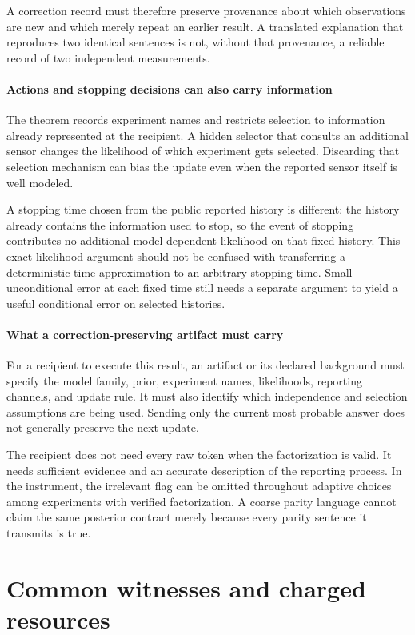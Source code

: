 \documentclass[11pt,letterpaper]{article}
\theoremstyle{plain}
\theoremstyle{definition}
\begin{document}
A correction record must therefore preserve provenance about which observations are new and which merely repeat an earlier result. A translated explanation that reproduces two identical sentences is not, without that provenance, a reliable record of two independent measurements.

\subsection{Actions and stopping decisions can also carry information}
The theorem records experiment names and restricts selection to information already represented at the recipient. A hidden selector that consults an additional sensor changes the likelihood of which experiment gets selected. Discarding that selection mechanism can bias the update even when the reported sensor itself is well modeled.

A stopping time chosen from the public reported history is different: the history already contains the information used to stop, so the event of stopping contributes no additional model-dependent likelihood on that fixed history. This exact likelihood argument should not be confused with transferring a deterministic-time approximation to an arbitrary stopping time. Small unconditional error at each fixed time still needs a separate argument to yield a useful conditional error on selected histories.

\subsection{What a correction-preserving artifact must carry}
For a recipient to execute this result, an artifact or its declared background must specify the model family, prior, experiment names, likelihoods, reporting channels, and update rule. It must also identify which independence and selection assumptions are being used. Sending only the current most probable answer does not generally preserve the next update.

The recipient does not need every raw token when the factorization is valid. It needs sufficient evidence and an accurate description of the reporting process. In the instrument, the irrelevant flag can be omitted throughout adaptive choices among experiments with verified factorization. A coarse parity language cannot claim the same posterior contract merely because every parity sentence it transmits is true.


\clearpage\part{Common witnesses and charged resources}
\end{document}
